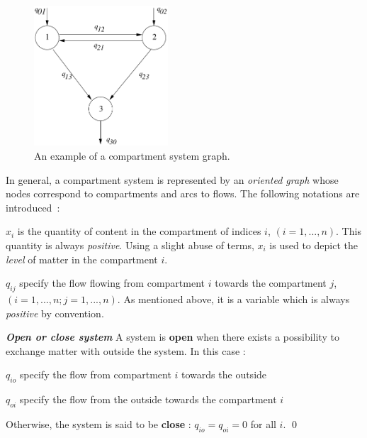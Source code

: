 \begin{figure}[ht]
\begin{center}
\includegraphics[width=5cm]{exemplecomp}
\caption{An example of a compartment system graph.}
\label{fig:exemplecomp}
\end{center} 
\end{figure}

In general, a compartment system is represented by an {\em oriented graph} 
whose nodes correspond to compartments and arcs to flows. 
The following notations are introduced~:
\begin{description}
\item $x_i$ is the quantity of content in the compartment of indices $i$,
$(i = 1, ... ,n)$. This quantity is always {\em positive}. Using a slight abuse of terms,
$x_i$ is used to depict the {\em level} of matter in the compartment $i$.
\item $q_{ij}$ specify the flow flowing from compartment $i$ towards the  
compartment $j$, $(i = 1, ... ,n ; j = 1, ... ,n)$. As mentioned above, it is a
variable which is always {\em positive} by convention.
\end{description}

\begin{definition}{\bf \em Open or close system}
A system is {\bf open} when there exists a possibility to exchange matter
with outside the system.
In this case :  
\begin{description}
\item $q_{io}$ specify the flow from  compartment $i$ towards the outside
\item $q_{oi}$ specify the flow from the outside towards the compartment $i$
\end{description}
Otherwise, the system is said to be {\bf close} : $q_{io} = 
q_{oi} = 0$ for all $i$. \qed
\end{definition}

